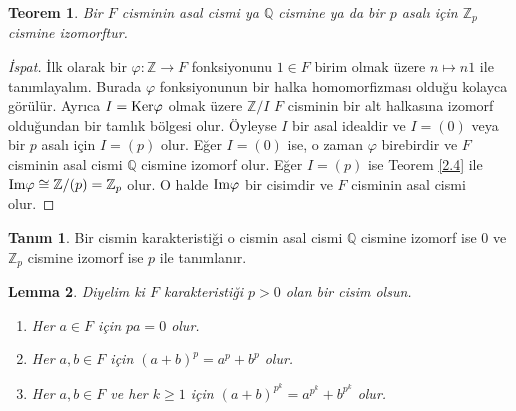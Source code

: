 \documentclass{article}
\newtheorem{thm}{Teorem}[section]
\newtheorem{lem}[thm]{Lemma}
\theoremstyle{definition}
\newtheorem{defn}{Tanım}[section]
\theoremstyle{remark}
\begin{document}
    		\begin{thm}\label{2.12}
    		    Bir $F$ cisminin asal cismi ya $\mathbb{Q}$ cismine ya da bir $p$ asalı için $\mathbb{Z}_p$ cismine izomorftur.
		    \end{thm}
		    
		    \begin{proof}[İspat]
		        İlk olarak bir $\varphi: \mathbb{Z} \to F$ fonksiyonunu $1 \in F$ birim olmak üzere $n \mapsto n1$ ile tanımlayalım. Burada $\varphi$ fonksiyonunun bir halka homomorfizması olduğu kolayca görülür. Ayrıca $I = \textup{Ker}\varphi$ olmak üzere $\mathbb{Z}/I$ $F$ cisminin bir alt halkasına izomorf olduğundan bir tamlık bölgesi olur. Öyleyse $I$ bir asal idealdir ve $I = (0)$ veya bir $p$ asalı için $I = (p)$ olur. Eğer $I = (0)$ ise, o zaman $\varphi$ birebirdir ve $F$ cisminin asal cismi $\mathbb{Q}$ cismine izomorf olur. Eğer $I = (p)$ ise Teorem \ref{2.4} ile $\textup{Im}\varphi \cong \mathbb{Z}/(p) = \mathbb{Z}_p$ olur. O halde $\textup{Im}\varphi$ bir cisimdir ve $F$ cisminin asal cismi olur.
		    \end{proof}
    		
    		\begin{defn}
    		    Bir cismin karakteristiği o cismin asal cismi $\mathbb{Q}$ cismine izomorf ise 0 ve $\mathbb{Z}_p$ cismine izomorf ise $p$ ile tanımlanır.
    		\end{defn}
    		
    		\begin{lem}
    		    Diyelim ki $F$ karakteristiği $p > 0$ olan bir cisim olsun.
    		    \begin{enumerate}
				\renewcommand{\labelenumi}{(\roman{enumi})}
				    \item Her $a \in F$ için $pa = 0$ olur.
				    \item Her $a, b \in F$ için $(a + b)^p = a^p + b^p$ olur.
				    \item Her $a, b \in F$ ve her $k \geq 1$ için $(a + b)^{p^k} = a^{p^k} + b^{p^k}$ olur.
			    \end{enumerate}
		    \end{lem}
		    
\end{document}
